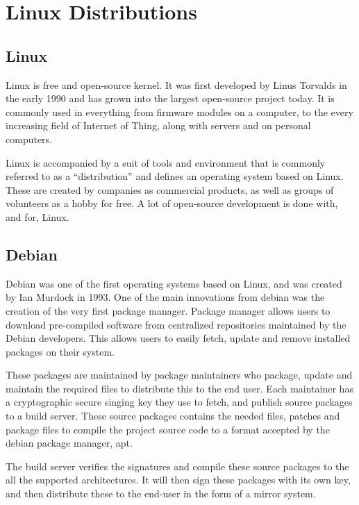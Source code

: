 \documentclass[../Main/thesis.tex]{subfiles}
\begin{document}
\section{Linux Distributions}\label{sec:linux_distributions}
    \subsection*{Linux}
    Linux is free and open-source kernel. It was first developed by Linus
    Torvalds in the early 1990 and has grown into the largest open-source
    project today. It is commonly used in everything from firmware modules on a
    computer, to the every increasing field of Internet of Thing, along with
    servers and on personal computers.

    Linux is accompanied by a suit of tools and environment that is commonly
    referred to as a ``distribution'' and defines an operating system based on
    Linux. These are created by companies as commercial products, as well as
    groups of volunteers as a hobby for free. A lot of open-source development
    is done with, and for, Linux.

    \subsection*{Debian}
    Debian was one of the first operating systems based on Linux, and was
    created by Ian Murdock in 1993. One of the main innovations from debian was
    the creation of the very first package manager. Package manager allows users
    to download pre-compiled software from centralized repositories maintained
    by the Debian developers.  This allows users to easily fetch, update and
    remove installed packages on their system.

    These packages are maintained by package maintainers who package, update and
    maintain the required files to distribute this to the end user. Each
    maintainer has a cryptographic secure singing key they use to fetch, and
    publish source packages to a build server. These source packages contains
    the needed files, patches and package files to compile the project source
    code to a format accepted by the debian package manager, apt.

    The build server verifies the signatures and compile these source packages
    to the all the supported architectures. It will then sign these packages
    with its own key, and then distribute these to the end-user in the form of a
    mirror system.
\end{document}
